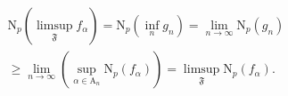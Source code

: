 \[
\begin{array}{l} \mathrm{N} _ {p} (\limsup _ {\mathfrak {F}} f _ {\alpha}) = \mathrm{N} _ {p} \left(\inf _ {n} g _ {n}\right) = \lim _ {n \to \infty} \mathrm{N} _ {p} (g _ {n}) \\ \geqslant \lim _ {n \to \infty} \left(\sup _ {\alpha \in \mathrm{A} _ {n}} \mathrm{N} _ {p} (f _ {\alpha})\right) = \limsup _ {\mathfrak {F}} \mathrm{N} _ {p} (f _ {\alpha}). \end{array}
\]

